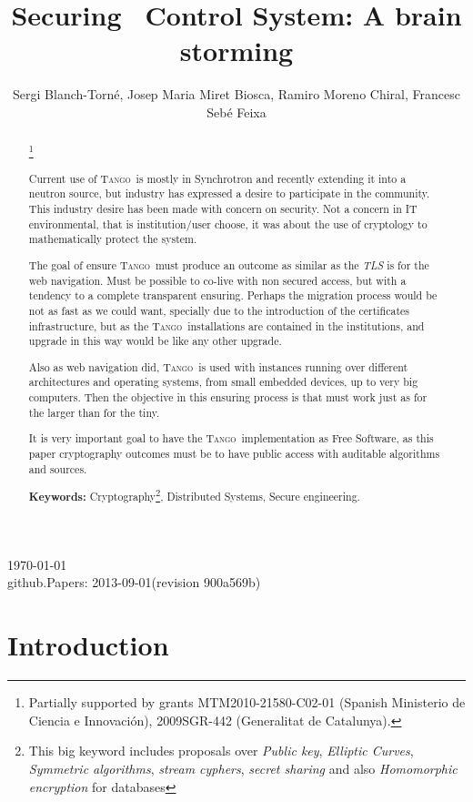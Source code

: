 \documentclass[10pt,a4paper,twoside]{llncs}
\title{Securing \tango\, Control System: A brain storming}
\author{Sergi Blanch-Torn\'e\inst{1}, Josep Maria Miret Biosca\inst{2}, Ramiro Moreno Chiral\inst{2}, Francesc Seb\'e Feixa\inst{2}}
\institute{
 Escola Polit\`ecnica Superior, Universitat de Lleida. Spain.\\
 \email{\tt sblanch@alumnes.udl.es}
 \and 
 Departament de Matem\`atica. Universitat de Lleida. Spain.\\
 \email{\tt \{miret,ramiro,fsebe\}@matematica.udl.es}
 }
\newcommand{\version}{github.Papers: 2013-09-01\;(revision 900a569b) } %
\newcommand{\tango}{\textsc{Tango}}
\begin{document}
\maketitle
\begin{center}
 \today\\
 \version
\end{center}


\begin{abstract}\footnote{Partially supported by grants MTM2010-21580-C02-01 (Spanish Ministerio de Ciencia e Innovaci\'on), 2009SGR-442 (Generalitat de Catalunya).}

Current use of \tango\, is mostly in Synchrotron and recently extending it into a neutron source, but industry has expressed a desire to participate in the community. This industry desire has been made with concern on security. Not a concern in IT environmental, that is institution/user choose, it was about the use of cryptology to mathematically protect the system.

The goal of ensure \tango\, must produce an outcome as similar as the \emph{TLS} is for the web navigation. Must be possible to co-live with non secured access, but with a tendency to a complete transparent ensuring. Perhaps the migration process would be not as fast as we could want, specially due to the introduction of the certificates infrastructure, but as the \tango\, installations are contained in the institutions, and upgrade in this way would be like any other upgrade.

Also as web navigation did, \tango\, is used with instances running over different architectures and operating systems, from small embedded devices, up to very big computers. Then the objective in this ensuring process is that must work just as for the larger than for the tiny.

It is very important goal to have the \tango\, implementation as Free Software, as this paper cryptography outcomes must be to have public access with auditable algorithms and sources.
   
{\bf Keywords:} Cryptography\footnote{This big keyword includes proposals over \emph{Public key}, \emph{Elliptic Curves}, \emph{Symmetric algorithms}, \emph{stream cyphers}, \emph{secret sharing} and also \emph{Homomorphic encryption} for databases}, Distributed Systems, Secure engineering.

\end{abstract}

%
\section{Introduction \label{sec:introduction}}
\end{document}
